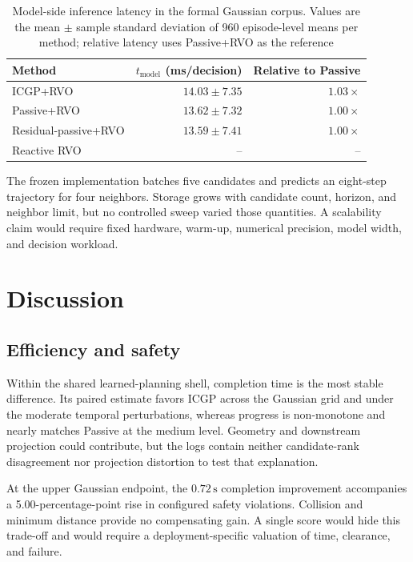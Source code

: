 \documentclass[pdflatex,sn-mathphys-num]{sn-jnl}
\begin{document}
\begin{table}[htbp]
\caption{Model-side inference latency in the formal Gaussian corpus. Values are the mean $\pm$ sample standard deviation of 960 episode-level means per method; relative latency uses Passive+RVO as the reference}
\label{tab:latency}
\centering
\small
\begin{tabular}{@{}lrr@{}}
\toprule
Method & $t_{\mathrm{model}}$ (ms/decision) & Relative to Passive \\
\midrule
ICGP+RVO & $14.03 \pm 7.35$ & $1.03\times$ \\
Passive+RVO & $13.62 \pm 7.32$ & $1.00\times$ \\
Residual-passive+RVO & $13.59 \pm 7.41$ & $1.00\times$ \\
Reactive RVO & -- & -- \\
\bottomrule
\end{tabular}
\end{table}

The frozen implementation batches five candidates and predicts an eight-step trajectory for four neighbors. Storage grows with candidate count, horizon, and neighbor limit, but no controlled sweep varied those quantities. A scalability claim would require fixed hardware, warm-up, numerical precision, model width, and decision workload.

\section{Discussion}
\label{sec:discussion}

\subsection{Efficiency and safety}

Within the shared learned-planning shell, completion time is the most stable difference. Its paired estimate favors ICGP across the Gaussian grid and under the moderate temporal perturbations, whereas progress is non-monotone and nearly matches Passive at the medium level. Geometry and downstream projection could contribute, but the logs contain neither candidate-rank disagreement nor projection distortion to test that explanation.

At the upper Gaussian endpoint, the $0.72\,\mathrm{s}$ completion improvement accompanies a 5.00-percentage-point rise in configured safety violations. Collision and minimum distance provide no compensating gain. A single score would hide this trade-off and would require a deployment-specific valuation of time, clearance, and failure.
\end{document}
